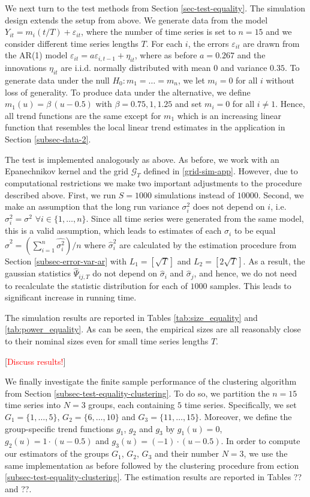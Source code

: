 We next turn to the test methods from Section \ref{sec-test-equality}. The simulation design extends the setup from above. We generate data from the model $Y_{it} = m_i(t/T) + \varepsilon_{it}$, where the number of time series is set to $n = 15$ and we consider different time series lengths $T$. For each $i$, the errors $\varepsilon_{it}$ are drawn from the AR(1) model $\varepsilon_{it} = a \varepsilon_{i,t-1} + \eta_{it}$, where as before $a = 0.267$ and the innovations $\eta_{it}$ are i.i.d. normally distributed with mean $0$ and variance $0.35$. To generate data under the null $H_0: m_1 = \ldots = m_n$, we let $m_i = 0$ for all $i$ without loss of generality. To produce data under the alternative, we define $m_1(u) = \beta \, (u - 0.5) $ with $\beta = 0.75, 1, 1.25$ and set $m_i = 0$ for all $i \ne 1$. Hence, all trend functions are the same except for $m_1$ which is an increasing linear function that resembles the local linear trend estimates in the application in Section \ref{subsec-data-2}. 


The test is implemented analogously as above. As before, we work with an Epanechnikov kernel and the grid $\mathcal{G}_T$ defined in \eqref{grid-sim-app}. However, due to computational restrictions we make two important adjustments to the procedure described above. First, we run $S = 1000$ simulations instead of $10000$. Second, we make an assumption that the long run variance $\sigma_i^2$ does not depend on $i$, i.e. $\sigma_i^2 = \sigma^2$ $\forall i\in \{1, \ldots, n\}$. Since all time series were generated from the same model, this is a valid assumption, which leads to estimates of each $\sigma_i$ to be equal $\widehat{\sigma}^2 = (\sum_{i = 1}^n\widehat{\sigma_i^2})/n$ where $\widehat{\sigma}_i^2$ are calculated by the estimation procedure from Section \ref{subsec-error-var-ar} with $L_1 = [\sqrt{T}]$ and $L_2 = [2 \sqrt{T}]$. As a result, the gaussian statistics $\widehat{\Psi}_{ij, T}$ do not depend on $\widehat{\sigma}_i$ and $\widehat{\sigma}_j$, and hence, we do not need to recalculate the statistic distribution for each of $1000$ samples. This leads to significant increase in running time.

The simulation results are reported in Tables \ref{tab:size_equality} and \ref{tab:power_equality}. As can be seen, the empirical sizes are all reasonably close to their nominal sizes even for small time series lengths $T$.

[\textcolor{red}{Discuss results!}]


We finally investigate the finite sample performance of the clustering algorithm from Section \ref{subsec-test-equality-clustering}. To do so, we partition the $n = 15$ time series into $N=3$ groups, each containing $5$ time series. Specifically, we set $G_1 = \{1,\ldots,5\}$, $G_2 = \{6,\ldots,10\}$ and $G_3 =  \{11,\ldots,15\}$. Moreover, we define the group-specific trend functions $g_1$, $g_2$ and $g_3$ by $g_1(u) = 0$, $g_2(u) = 1 \cdot (u - 0.5)$ and $g_3(u) =  (- 1) \cdot (u - 0.5)$. In order to compute our estimators of the groups $G_1$, $G_2$, $G_3$ and their number $N = 3$, we use the same implementation as before followed by the clustering procedure from ection \ref{subsec-test-equality-clustering}. The estimation results are reported in Tables ?? and ??. 

